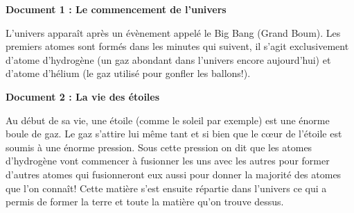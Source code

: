 \documentclass[10pt]{article}
\begin{document}
\begin{question}
	\end{question}



\begin{question}
	\end{question}


\begin{question}
	\end{question}

\begin{question}
	\end{question}
\begin{minipage}[t]{0.45\textwidth}
	{\centering \textbf{\color{DarkBlue} {Document 1 : Le commencement de l'univers}}}
	
	L'univers apparaît après un évènement appelé le Big Bang (Grand Boum).
	Les premiers atomes sont formés dans les minutes qui suivent, 
	il s'agit exclusivement d'atome d'hydrogène (un gaz abondant dans l'univers encore aujourd'hui)
	et d'atome d'hélium (le gaz utilisé pour gonfler les ballons!).
\end{minipage}
\hspace{20pt}
\begin{minipage}[t]{0.45\textwidth}
	{\centering \textbf{\color{DarkBlue} {Document 2 : La vie des étoiles}}}

	Au début de sa vie, une étoile (comme le soleil par exemple) est une énorme boule
	de gaz. Le gaz s'attire lui même tant et si bien que le c\oe ur de l'étoile est soumis à
	une énorme pression. Sous cette pression on dit que les atomes d'hydrogène vont commencer à fusionner 
	les uns avec les autres pour former d'autres atomes qui fusionneront eux aussi pour donner 
	la majorité des atomes que l'on connaît! Cette matière s'est ensuite répartie dans l'univers
	ce qui a permis de former la terre et toute la matière qu'on trouve dessus.
\end{minipage}
\end{document}

